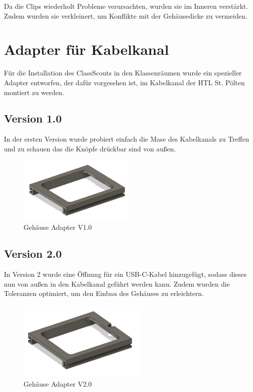 \begin{inhalt}
Da die Clips wiederholt Probleme verursachten, wurden sie im Inneren verstärkt.  
Zudem wurden sie verkleinert, um Konflikte mit der Gehäusedicke zu vermeiden.


\newpage

\section{Adapter für Kabelkanal}

Für die Installation des ClassScouts in den Klassenräumen wurde ein spezieller Adapter entworfen, der dafür vorgesehen ist, im Kabelkanal der HTL St. Pölten montiert zu werden.


\subsection{Version 1.0}

In der ersten Version wurde probiert einfach die Mase des Kabelkanals zu Treffen und zu schauen das die Knöpfe drückbar sind von außen.

\begin{figure}[!htb]
\centering
\includegraphics[width=0.5\textwidth]{files/Thomas/pics/adapter/1.0/image.png}
\caption[Bildbezeichnung für Abbildungsverzeichnis]{Gehäuse Adapter V1.0}
\label{fig:gehaeuse_internet_bild}
\end{figure}


\subsection{Version 2.0}

In Version 2 wurde eine Öffnung für ein USB-C-Kabel hinzugefügt, sodass dieses nun von außen in den Kabelkanal geführt werden kann.  
Zudem wurden die Toleranzen optimiert, um den Einbau des Gehäuses zu erleichtern.


\begin{figure}[!htb]
\centering
\includegraphics[width=0.55\textwidth]{files/Thomas/pics/adapter/2.0/image.png}
\caption[Bildbezeichnung für Abbildungsverzeichnis]{Gehäuse Adapter V2.0}
\label{fig:gehaeuse_internet_bild}
\end{figure}




\end{inhalt}
